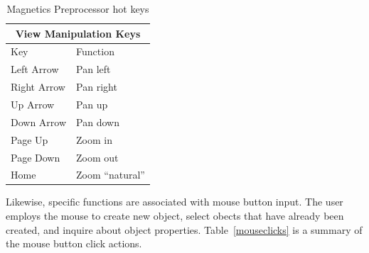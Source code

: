 \documentclass[12pt]{report}
\begin{document}
\begin{table}
\vspace*{12pt}
\begin{tabular}{|l|l|} \hline \hline
\multicolumn{2}{|c|}{View Manipulation Keys} \\ \hline \hline
 Key    & Function \\ \hline \hline
 Left Arrow  & Pan left \\ \hline
 Right Arrow  & Pan right \\ \hline
 Up Arrow  & Pan up \\ \hline
 Down Arrow  & Pan down \\ \hline
 Page Up & Zoom in  \\ \hline
 Page Down & Zoom out \\ \hline
 Home & Zoom ``natural'' \\ \hline \hline
\end{tabular}
\caption{Magnetics Preprocessor hot keys}
\label{hotkeys}
\end{table}

Likewise, specific functions are associated with mouse button
input.  The user employs the mouse to create new object, select
obects that have already been created, and inquire about object
properties.  Table~\ref{mouseclicks} is a summary of the mouse
button click actions.
\end{document}
